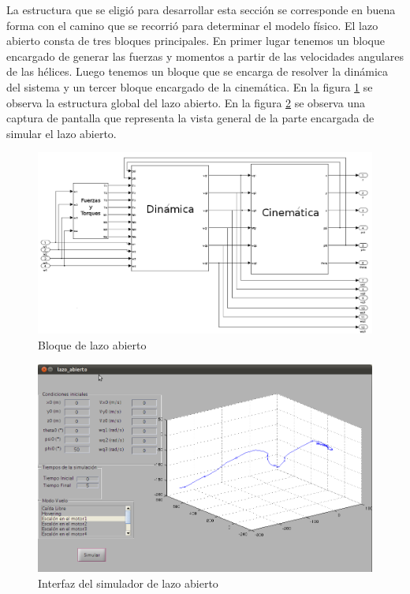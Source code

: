 \documentclass[main]{subfiles}
\begin{document}
La estructura que se eligi\'o para desarrollar esta secci\'on se corresponde en buena forma con el camino que se recorri\'o para determinar el modelo f\'isico. El lazo abierto consta de tres bloques principales. En primer lugar tenemos un bloque encargado de generar las fuerzas y momentos a partir de las velocidades angulares de las h\'elices. Luego tenemos un bloque que se encarga de resolver la din\'amica del sistema y un tercer bloque encargado de la cinem\'atica. En la figura \ref{fig:lazo_abierto} se observa la estructura global del lazo abierto. En la figura \ref{fig:vista} se observa una captura de pantalla que representa la vista general de la parte encargada de simular el lazo abierto.
\begin{figure}[h!]
	\centering
	\includegraphics[width=1\textwidth]{./pics_simulador/lazo_abierto.pdf}
	\caption{Bloque de lazo abierto}
	\label{fig:lazo_abierto}
\end{figure}

\begin{figure}[h!]
	\centering
	\includegraphics[width=1\textwidth]{./pics_simulador/vista.png}
	\caption{Interfaz del simulador de lazo abierto}
	\label{fig:vista}
\end{figure}
\end{document}

